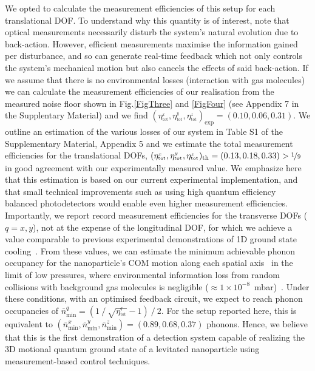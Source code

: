 \documentclass[%
 reprint,
 amsmath,amssymb,
 aps,
pra,
]{revtex4-2}
\begin{document}
We opted to calculate the measurement efficiencies of this setup for each translational DOF. To understand why this quantity is of interest, note that optical measurements necessarily disturb the system's natural evolution due to back-action. However, efficient measurements maximise the information gained per disturbance, and so can generate real-time feedback which not only controls the system's mechanical motion but also cancels the effects of said back-action. If we assume that there is no environmental losses (interaction with gas molecules) we can calculate the measurement efficiencies of our realisation from the measured noise floor shown in Fig.\ref{FigThree} and \ref{FigFour} (see Appendix 7 in the Supplentary Material) and we find ${(\eta_{^{\mathrm{tot}}}^{_{x}}, \eta_{^{\mathrm{tot}}}^{_{y}}, \eta_{^{\mathrm{tot}}}^{_{z}})_{\mathrm{exp}} = (0.10, 0.06, 0.31)}$. We outline an estimation of the various losses of our system in Table S1 of the Supplementary Material, Appendix 5 and we estimate the total measurement efficiencies for the translational DOFs, ${(\eta_{^{\mathrm{tot}}}^{_{x}}, \eta_{^{\mathrm{tot}}}^{_{y}}, \eta_{^{\mathrm{tot}}}^{_{z}})_{\mathrm{th}} = (0.13, 0.18, 0.33)} > \nicefrac{1}{9}$ in good agreement with our experimentally measured value. We emphasize here that this estimation is based on our current experimental implementation, and that small technical improvements such as using high quantum efficiency balanced photodetectors would enable even higher measurement efficiencies. Importantly, we report record measurement efficiencies for the transverse DOFs ($q=x, y$), not at the expense of the longitudinal DOF, for which we achieve a value comparable to previous experimental demonstrations of 1D ground state cooling~\cite{tebbenjohanns_quantum_2021, magrini_real-time_2021}. From these values, we can estimate the minimum achievable phonon occupancy for the nanoparticle's COM motion along each spatial axis~\cite{wiseman_quantum_2009, rossi_measurement-based_2018, tebbenjohanns_quantum_2021} in the limit of low pressures, where environmental information loss from random collisions with background gas molecules is negligible (${\approx 1\times10^{-8}}$~mbar)~\cite{clerk_introduction_2010}. Under these conditions, with an optimised feedback circuit, we expect to reach phonon occupancies of ${\bar{n}_{\mathrm{min}}^{q}=(1~/~\sqrt{\eta^{_{q}}_{^{\mathrm{tot}}}} - 1)~/~2}$. For the setup reported here, this is equivalent to ${(\bar{n}_{\mathrm{min}}^{x}, \bar{n}_{\mathrm{min}}^{y},\bar{n}_{\mathrm{min}}^{z}) = (0.89, 0.68, 0.37)}$ phonons. Hence, we believe that this is the first demonstration of a detection system capable of realizing the 3D motional quantum ground state of a levitated nanoparticle using measurement-based control techniques.
\end{document}
